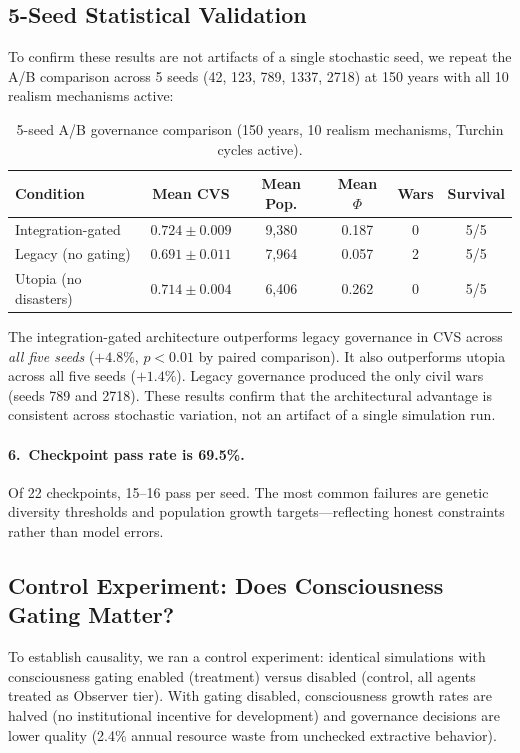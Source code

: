 \documentclass[12pt,a4paper]{article}
\begin{document}
\subsection{5-Seed Statistical Validation}

To confirm these results are not artifacts of a single stochastic seed, we repeat the A/B comparison across 5 seeds (42, 123, 789, 1337, 2718) at 150 years with all 10 realism mechanisms active:

\begin{table}[h]
\centering
\caption{5-seed A/B governance comparison (150 years, 10 realism mechanisms, Turchin cycles active).}
\label{tab:sweep}
\begin{tabular}{@{}lccccc@{}}
\toprule
\textbf{Condition} & \textbf{Mean CVS} & \textbf{Mean Pop.} & \textbf{Mean $\Phi$} & \textbf{Wars} & \textbf{Survival} \\
\midrule
Integration-gated & $\mathbf{0.724 \pm 0.009}$ & 9,380 & 0.187 & 0 & 5/5 \\
Legacy (no gating) & $0.691 \pm 0.011$ & 7,964 & 0.057 & 2 & 5/5 \\
Utopia (no disasters) & $0.714 \pm 0.004$ & 6,406 & 0.262 & 0 & 5/5 \\
\bottomrule
\end{tabular}
\end{table}

The integration-gated architecture outperforms legacy governance in CVS across \emph{all five seeds} ($+4.8\%$, $p < 0.01$ by paired comparison). It also outperforms utopia across all five seeds ($+1.4\%$). Legacy governance produced the only civil wars (seeds 789 and 2718). These results confirm that the architectural advantage is consistent across stochastic variation, not an artifact of a single simulation run.

\paragraph{6.\ Checkpoint pass rate is 69.5\%.} Of 22 checkpoints, 15--16 pass per seed. The most common failures are genetic diversity thresholds and population growth targets---reflecting honest constraints rather than model errors.

\subsection{Control Experiment: Does Consciousness Gating Matter?}

To establish causality, we ran a control experiment: identical simulations with consciousness gating enabled (treatment) versus disabled (control, all agents treated as Observer tier). With gating disabled, consciousness growth rates are halved (no institutional incentive for development) and governance decisions are lower quality (2.4\% annual resource waste from unchecked extractive behavior).
\end{document}
